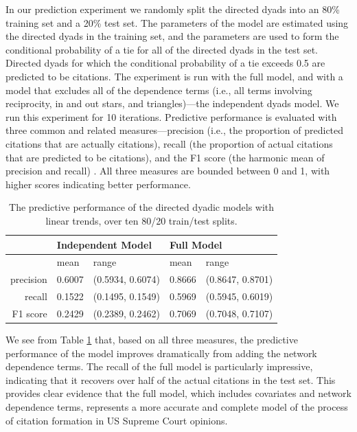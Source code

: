 \documentclass[headsepline=true, abstracton]{scrartcl}
\begin{document}
In our prediction experiment we randomly split the directed dyads into an 80\% training set and a 20\% test set. The parameters of the model are estimated using the directed dyads in the training set, and the parameters are used to form the conditional probability of a tie for all of the directed dyads in the test set. Directed dyads for which the conditional probability of a tie exceeds 0.5 are predicted to be citations. The experiment is run with the full model, and with a model that excludes all of the dependence terms (i.e., all terms involving reciprocity, in and out stars, and triangles)---the independent dyads model. We run this experiment for 10 iterations. Predictive performance is evaluated with three common and related measures---precision (i.e., the proportion of predicted citations that are actually citations), recall (the proportion of actual citations that are predicted to be citations), and the F1 score (the harmonic mean of precision and recall) \citep[see, e.g.,][for discussion of these measures]{makhoul1999performance}. All three measures are bounded between 0 and 1, with higher scores indicating better performance.

\begin{table}[H]
\centering

\begin{tabular}{rllll}
\hline \hline
& \multicolumn{2}{l}{Independent Model } & \multicolumn{2}{l}{Full Model} \\ \hline 
 & mean & range & mean & range \\ 
  \hline
precision & 0.6007 & (0.5934, 0.6074) & 0.8666 & (0.8647, 0.8701) \\ 
  recall & 0.1522 & (0.1495, 0.1549) & 0.5969 & (0.5945, 0.6019) \\ 
  F1 score & 0.2429 & (0.2389, 0.2462) & 0.7069 & (0.7048, 0.7107) \\ 
   \hline \hline
\end{tabular}
\caption{The predictive performance of the directed dyadic models with linear trends, over ten 80/20 train/test splits.}
\label{tab:prediction_linear}

\end{table}

We see from Table \ref{tab:prediction_linear} that, based on all three measures, the predictive performance of the model improves dramatically from adding the network dependence terms. The recall of the full model is particularly impressive, indicating that it recovers over half of the actual citations in the test set. This provides clear evidence that the full model, which includes covariates and network dependence terms, represents a more accurate and complete model of the process of citation formation in US Supreme Court opinions.
\end{document}
